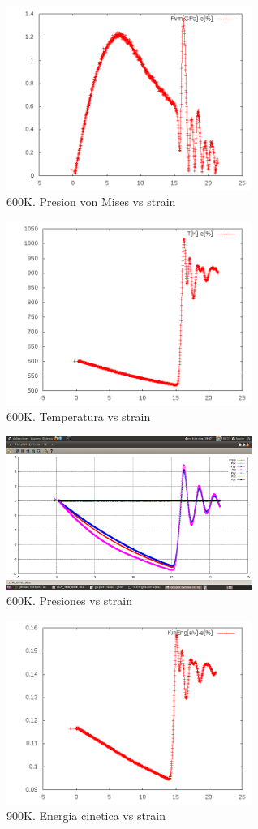 \documentclass[10pt, oneside]{article} %
\begin{document}
\begin{figure}[H]
\centering
\includegraphics[width=8cm]{Figures/600K_PressVonMises.png}
\caption{600K. Presion von Mises vs strain}
\end{figure}

\begin{figure}[H]
\centering
\includegraphics[width=8cm]{Figures/600K_Temp.png}
\caption{600K. Temperatura vs strain}
\end{figure}

\begin{figure}[H]
\centering
\includegraphics[width=8cm]{Figures/600K_TensorPress.png}
\caption{600K. Presiones vs strain}
\end{figure}

\begin{figure}[H]
\centering
\includegraphics[width=8cm]{Figures/900K_KinEnergy.png}
\caption{900K. Energia cinetica vs strain}
\end{figure}
\end{document}
